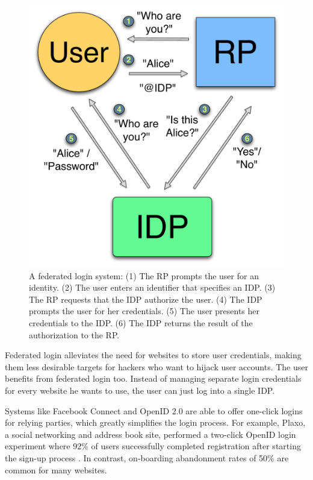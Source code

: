 \documentclass{llncs}
\begin{document}
\begin{figure}
  \centering
  \includegraphics[scale=0.5]{figs/fig-fedlog-color.pdf}
  \caption{A federated login system: (1) The RP prompts the user
    for an identity. (2) The user enters an identifier that specifies
    an IDP. (3) The RP requests that the IDP authorize the user. (4)
    The IDP prompts the user for her credentials. (5) The user
    presents her credentials to the IDP. (6) The IDP returns the
    result of the authorization to the RP.}
  \label{fig:fedlog}
\end{figure}

Federated login alleviates the need for websites to store user
credentials, making them less desirable targets for hackers who want
to hijack user accounts. The user benefits from federated login too.
Instead of managing separate login credentials for every website he
wants to use, the user can just log into a single IDP.

Systems like Facebook Connect and OpenID 2.0 are able to offer
one-click logins for relying parties, which greatly simplifies the
login process. For example, Plaxo, a social networking and address
book site, performed a two-click OpenID login experiment where 92\% of
users successfully completed registration after starting the sign-up
process \cite{Ki09}. In contrast, on-boarding abandonment rates of
50\% are common for many websites.
\end{document}
